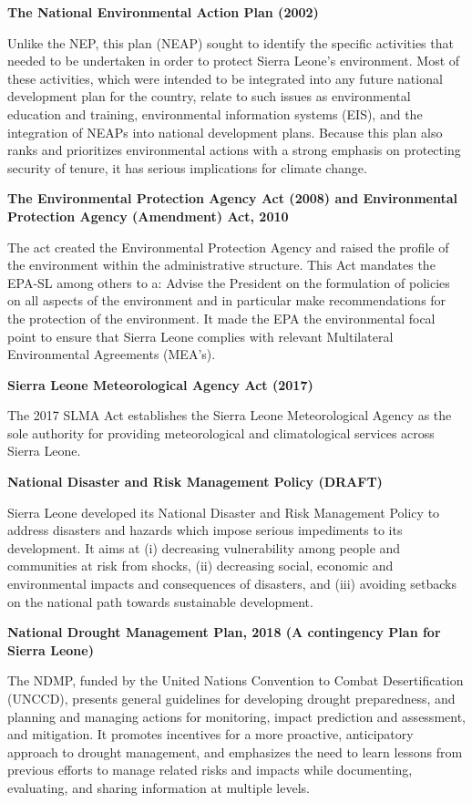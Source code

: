 \documentclass[
]{book}
\begin{document}
\textbf{The National Environmental Action Plan (2002)}

Unlike the NEP, this plan (NEAP) sought to identify the specific activities that needed to be undertaken in order to protect Sierra Leone's environment. Most of these activities, which were intended to be integrated into any future national development plan for the country, relate to such issues as environmental education and training, environmental information systems (EIS), and the integration of NEAPs into national development plans. Because this plan also ranks and prioritizes environmental actions with a strong emphasis on protecting security of tenure, it has serious implications for climate change.

\textbf{The Environmental Protection Agency Act (2008) and Environmental Protection Agency (Amendment) Act, 2010}

The act created the Environmental Protection Agency and raised the profile of the environment within the administrative structure. This Act mandates the EPA-SL among others to a: Advise the President on the formulation of policies on all aspects of the environment and in particular make recommendations for the protection of the environment. It made the EPA the environmental focal point to ensure that Sierra Leone complies with relevant Multilateral Environmental Agreements (MEA's).

\textbf{Sierra Leone Meteorological Agency Act (2017)}

The 2017 SLMA Act establishes the Sierra Leone Meteorological Agency as the sole authority for providing meteorological and climatological services across Sierra Leone.

\textbf{National Disaster and Risk Management Policy (DRAFT)}

Sierra Leone developed its National Disaster and Risk Management Policy to address disasters and hazards which impose serious impediments to its development. It aims at (i) decreasing vulnerability among people and communities at risk from shocks, (ii) decreasing social, economic and environmental impacts and consequences of disasters, and (iii) avoiding setbacks on the national path towards sustainable development.

\textbf{National Drought Management Plan, 2018 (A contingency Plan for Sierra Leone)}

The NDMP, funded by the United Nations Convention to Combat Desertification (UNCCD), presents general guidelines for developing drought preparedness, and planning and managing actions for monitoring, impact prediction and assessment, and mitigation. It promotes incentives for a more proactive, anticipatory approach to drought management, and emphasizes the need to learn lessons from previous efforts to manage related risks and impacts while documenting, evaluating, and sharing information at multiple levels.
\end{document}
